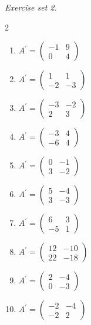 \par\noindent\emph{Exercise set 2.}\nopagebreak
\begin{multicols}{2}\raggedright
\begin{enumerate}[label=\arabic*., leftmargin=*, itemsep=1pt]
\item $A^{\prime}=\left(\begin{smallmatrix}-1 & 9\\ 0 & 4\end{smallmatrix}\right)$
\item $A^{\prime}=\left(\begin{smallmatrix}1 & 1\\ -2 & -3\end{smallmatrix}\right)$
\item $A^{\prime}=\left(\begin{smallmatrix}-3 & -2\\ 2 & 3\end{smallmatrix}\right)$
\item $A^{\prime}=\left(\begin{smallmatrix}-3 & 4\\ -6 & 4\end{smallmatrix}\right)$
\item $A^{\prime}=\left(\begin{smallmatrix}0 & -1\\ 3 & -2\end{smallmatrix}\right)$
\item $A^{\prime}=\left(\begin{smallmatrix}5 & -4\\ 3 & -3\end{smallmatrix}\right)$
\item $A^{\prime}=\left(\begin{smallmatrix}6 & 3\\ -5 & 1\end{smallmatrix}\right)$
\item $A^{\prime}=\left(\begin{smallmatrix}12 & -10\\ 22 & -18\end{smallmatrix}\right)$
\item $A^{\prime}=\left(\begin{smallmatrix}2 & -4\\ 0 & -3\end{smallmatrix}\right)$
\item $A^{\prime}=\left(\begin{smallmatrix}-2 & -4\\ -2 & 2\end{smallmatrix}\right)$

\end{enumerate}
\end{multicols}

